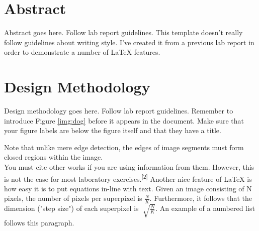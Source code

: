 \documentclass[CMPE]{KGCOEReport}
\begin{document}
\maketitle

\renewcommand\cftsecleader{\cftdotfill{\cftdotsep}} %
\tableofcontents
\newpage
\setcounter{secnumdepth}{0} %
\renewcommand\um{$\mu$m} %
\newcommand\ua{$\mu$a }
\newcommand{\ol}[1]{\overline{#1}}

\section{Abstract}
Abstract goes here. Follow lab report guidelines. This template doesn't really follow guidelines about writing style. I've created it from a previous lab report in order to demonstrate a number of LaTeX features.\\


\section{Design Methodology}

Design methodology goes here. Follow lab report guidelines. Remember to introduce Figure \ref{img:dog} before it appears in the document. Make sure that your figure labels are below the figure itself and that they have a title.


Note that unlike mere edge detection, the edges of image segments must form closed regions within the image. \\

You must cite other works if you are using information from them. However, this is not the case for most laboratory exercises.\textsuperscript{[2]} Another nice feature of LaTeX is how easy it is to put equations in-line with text. Given an image consisting of N pixels, the number of pixels per superpixel is $\frac{N}{K}$. Furthermore, it follows that the dimension ("step size") of each superpixel is $\sqrt[]{\frac{N}{K}}$. An example of a numbered list follows this paragraph.
\end{document}
